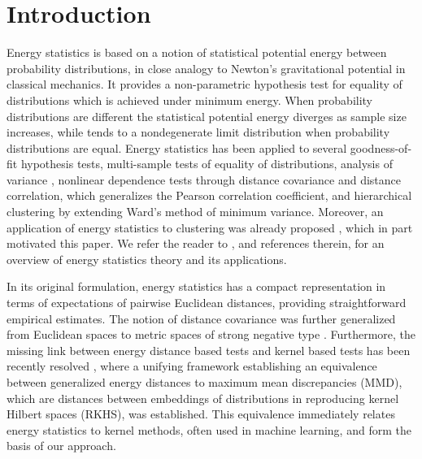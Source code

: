 \documentclass[aps,preprint,nofootinbib,floatfix]{revtex4-1}
\begin{document}


\section{Introduction}

Energy statistics \cite{Szkely2013}
is based on a 
notion of statistical potential energy between probability distributions,
in close analogy to Newton's gravitational potential in classical mechanics. 
It provides a non-parametric hypothesis test for equality of 
distributions which is achieved 
under minimum energy. When probability distributions are different the 
statistical potential energy diverges as sample size increases, while tends 
to a nondegenerate limit distribution when probability
distributions are equal. 
Energy statistics has been applied to several goodness-of-fit 
hypothesis tests, multi-sample tests of equality of distributions, 
analysis of variance \cite{RizzoVariance}, nonlinear dependence tests through
distance covariance and distance correlation, which generalizes the Pearson
correlation coefficient, and hierarchical clustering \cite{RizzoClustering} 
by extending Ward's method of minimum variance. Moreover, an application of 
energy statistics to clustering was already proposed \cite{Kgroups}, 
which in part motivated this paper. We refer the reader to \cite{Szkely2013}, 
and references therein, for an overview of energy statistics theory and 
its applications.

In its original formulation, energy statistics has a compact representation
in terms of expectations of pairwise Euclidean distances, providing
straightforward empirical estimates. 
The notion of distance covariance was further generalized from Euclidean 
spaces to metric spaces of strong negative type \cite{Lyons}. Furthermore, 
the missing link between energy distance based tests and kernel 
based tests has 
been recently resolved \cite{Sejdinovic2013}, where a unifying framework
establishing an equivalence between generalized energy distances to maximum
mean discrepancies (MMD), which are distances between embeddings of 
distributions in reproducing kernel Hilbert spaces (RKHS), was established. 
This equivalence immediately relates energy statistics to
kernel methods, often used in machine learning, and form the basis 
of our approach.
\end{document}
